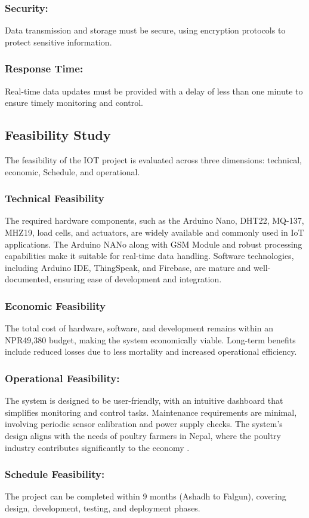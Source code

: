 \documentclass[../main.tex]{subfiles}
\begin{document}
\subsubsection{Security:}
Data transmission and storage must be secure, using encryption protocols to protect sensitive information.
\subsubsection{Response Time:}
 Real-time data updates must be provided with a delay of less than one
 minute to ensure timely monitoring and control.

\subsection{Feasibility Study}
  The feasibility of the IOT project is evaluated across three dimensions: technical, economic, Schedule, and operational.

  \subsubsection{Technical Feasibility}
The required hardware components, such as the Arduino Nano, DHT22, MQ-137, MHZ19, load cells, and actuators, are widely available and commonly used in IoT applications. The Arduino NANo along with GSM Module and robust processing capabilities make it suitable for real-time data handling. Software technologies, including Arduino IDE, ThingSpeak, and Firebase, are mature and well-documented, ensuring ease of development and integration.


\subsubsection{Economic Feasibility}
 The total cost of hardware, software, and development  remains within an NPR49,380 budget, making the system economically viable. Long-term benefits include reduced losses due to less mortality and increased operational efficiency. 


\subsubsection{ Operational Feasibility:}
 The system is designed to be user-friendly, with an intuitive dashboard that simplifies monitoring and control tasks. Maintenance requirements are minimal, involving periodic sensor calibration and power supply checks. The system’s design aligns with the needs of poultry farmers in Nepal, where the poultry industry contributes significantly to the economy .


\subsubsection{Schedule Feasibility: }
 The project can be completed within 9 months (Ashadh to Falgun), covering design, development, testing, and deployment phases.
\end{document}
